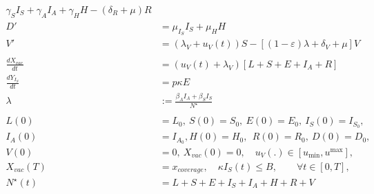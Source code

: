 \begin{equation}
\begin{aligned}
                \gamma_S I_S +
                \gamma_A I_A +
                \gamma_H H %
                - (\delta_R + \mu) R
        \\
            D' &=
                \mu_{I_S} I_S + \mu_H H
        \\
            V' &=
                (\lambda_V + u_V(t)) S
                - \left[
                (1 - \varepsilon) \lambda
                + \delta_V
                + \mu
                \right ] V
        \\
        \\
            \frac{dX_{vac}}{dt}
                &=
                (u_V(t) + \lambda_V)
                \left[
                    L + S + E + I_A + R
                \right]
        \\
            \frac{d Y_{I_S}}{dt}
                & = p \kappa E
        \\
            \lambda &:=
                \frac{\beta_A I_A + \beta_S I_S}{N^{\star}}
        \\
        \\
            L(0) &= L_0,
            \ S(0) = S_0,
            \ E(0) = E_0,
            \ I_S(0) = I_{S_{0}},
      \\
            I_A(0) &= I_{A_{0}},
            H(0) = H_0, \
            \ R(0) = R_0, \ D(0) = D_0,
      \\
            V(0) &= 0, \ X_{vac}(0) = 0, \quad
            u_V(.) \in [u_{\min}, u^{\max}],
      \\
            X_{vac}(T) &= x_{coverage},
      \quad
            \kappa I_S(t) \leq B, \qquad
            \forall t \in [0, T],
      \\
            N^{\star}(t) &=
                L + S +E + I_S + I_A +
                H + R + V
        \end{aligned}
\end{equation}

